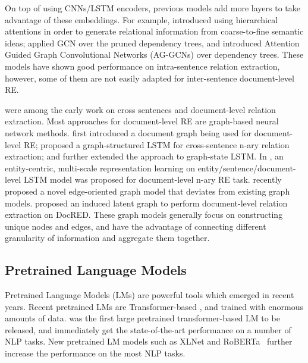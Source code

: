 \documentclass[11pt,a4paper]{article}
\begin{document}
On top of using CNNs/LSTM encoders, previous models add more layers to take advantage of these embeddings.
For example, \citet{han-etal-2018-hierarchical} introduced using hierarchical attentions in order to generate relational information from coarse-to-fine semantic ideas; \citet{zhang2017tacred} applied GCN over the pruned dependency trees, and \citet{guo-etal-2019-attention} introduced Attention Guided Graph Convolutional Networks (AG-GCNs) over dependency trees. These models have shown good performance on intra-sentence relation extraction, however, some of them are not easily adapted for inter-sentence document-level RE.




\citet{Li2016bio,quirk-poon-2017-distant,PengTACL2017} were among the early work on cross sentences and document-level relation extraction.
Most approaches for document-level RE are graph-based neural network methods.
\citet{quirk-poon-2017-distant} first introduced a document graph being used for document-level RE;
\citet{PengTACL2017} proposed a graph-structured LSTM for cross-sentence n-ary relation extraction; and \cite{song-etal-2018-n} further extended the approach to graph-state LSTM. 
In \cite{jia-etal-2019-document}, an entity-centric, multi-scale representation learning on entity/sentence/document-level LSTM model was proposed for document-level n-ary RE task. \citet{christopoulou-etal-2019-connecting} recently proposed a novel edge-oriented graph model that deviates from existing graph models.
\citet{acl2020latentreasoning} proposed an induced latent graph to perform document-level relation extraction on DocRED.
These graph models generally focus on constructing unique nodes and edges, 
and have the advantage of connecting different granularity of information and aggregate them together.



\subsection{Pretrained Language Models}
Pretrained Language Models (LMs) are powerful tools which emerged in recent years. 
Recent pretrained LMs \cite{radford2019GPT,devlin-bert,xlnet,anonymous2020roberta} are Transformer-based \cite{Vaswani17transformers}, and trained with enormous amounts of data. \cite{devlin-etal-2019-bert} was the first large pretrained transformer-based LM to be released, and immediately get the state-of-the-art performance on a number of NLP tasks. 
New pretrained LM models such as XLNet \cite{xlnet} and RoBERTa~\cite{anonymous2020roberta} further increase the performance on the most NLP tasks. 
\end{document}

